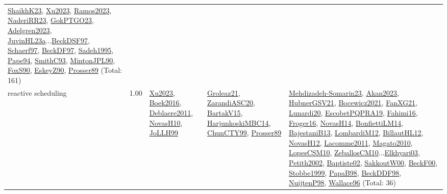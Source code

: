 {\begin{longtable}{p{3cm}r>{\raggedright\arraybackslash}p{6cm}>{\raggedright\arraybackslash}p{6cm}>{\raggedright\arraybackslash}p{8cm}}
\hyperref[detail:ShaikhK23]{ShaikhK23}, \hyperref[detail:Xu2023]{Xu2023}, \hyperref[detail:Ramos2023]{Ramos2023}, \hyperref[detail:NaderiRR23]{NaderiRR23}, \hyperref[detail:GokPTGO23]{GokPTGO23}, \hyperref[detail:Adelgren2023]{Adelgren2023}, \hyperref[detail:JuvinHL23a]{JuvinHL23a}...\hyperref[detail:BeckDSF97]{BeckDSF97}, \hyperref[detail:Schaerf97]{Schaerf97}, \hyperref[detail:BeckDF97]{BeckDF97}, \hyperref[detail:Sadeh1995]{Sadeh1995}, \hyperref[detail:Pape94]{Pape94}, \hyperref[detail:SmithC93]{SmithC93}, \hyperref[detail:MintonJPL90]{MintonJPL90}, \hyperref[detail:FoxS90]{FoxS90}, \hyperref[detail:EskeyZ90]{EskeyZ90}, \hyperref[detail:Prosser89]{Prosser89} (Total: 161)\\
\index{reactive scheduling}\index{Concepts!reactive scheduling}reactive scheduling &  1.00 & \hyperref[detail:Xu2023]{Xu2023}, \hyperref[detail:Boek2016]{Boek2016}, \hyperref[detail:Deblaere2011]{Deblaere2011}, \hyperref[detail:NovasH10]{NovasH10}, \hyperref[detail:JoLLH99]{JoLLH99} & \hyperref[detail:Groleaz21]{Groleaz21}, \hyperref[detail:ZarandiASC20]{ZarandiASC20}, \hyperref[detail:BartakV15]{BartakV15}, \hyperref[detail:HarjunkoskiMBC14]{HarjunkoskiMBC14}, \hyperref[detail:ChunCTY99]{ChunCTY99}, \hyperref[detail:Prosser89]{Prosser89} & \hyperref[detail:Mehdizadeh-Somarin23]{Mehdizadeh-Somarin23}, \hyperref[detail:Akan2023]{Akan2023}, \hyperref[detail:HubnerGSV21]{HubnerGSV21}, \hyperref[detail:Bocewicz2021]{Bocewicz2021}, \hyperref[detail:FanXG21]{FanXG21}, \hyperref[detail:Lunardi20]{Lunardi20}, \hyperref[detail:EscobetPQPRA19]{EscobetPQPRA19}, \hyperref[detail:Fahimi16]{Fahimi16}, \hyperref[detail:Froger16]{Froger16}, \hyperref[detail:NovasH14]{NovasH14}, \hyperref[detail:BonfiettiLM14]{BonfiettiLM14}, \hyperref[detail:BajestaniB13]{BajestaniB13}, \hyperref[detail:LombardiM12]{LombardiM12}, \hyperref[detail:BillautHL12]{BillautHL12}, \hyperref[detail:NovasH12]{NovasH12}, \hyperref[detail:Lacomme2011]{Lacomme2011}, \hyperref[detail:Magato2010]{Magato2010}, \hyperref[detail:LopesCSM10]{LopesCSM10}, \hyperref[detail:ZeballosCM10]{ZeballosCM10}...\hyperref[detail:Elkhyari03]{Elkhyari03}, \hyperref[detail:Petith2002]{Petith2002}, \hyperref[detail:Baptiste02]{Baptiste02}, \hyperref[detail:SakkoutW00]{SakkoutW00}, \hyperref[detail:BeckF00]{BeckF00}, \hyperref[detail:Stobbe1999]{Stobbe1999}, \hyperref[detail:PapaB98]{PapaB98}, \hyperref[detail:BeckDDF98]{BeckDDF98}, \hyperref[detail:NuijtenP98]{NuijtenP98}, \hyperref[detail:Wallace96]{Wallace96} (Total: 36)\\

\end{longtable}}
